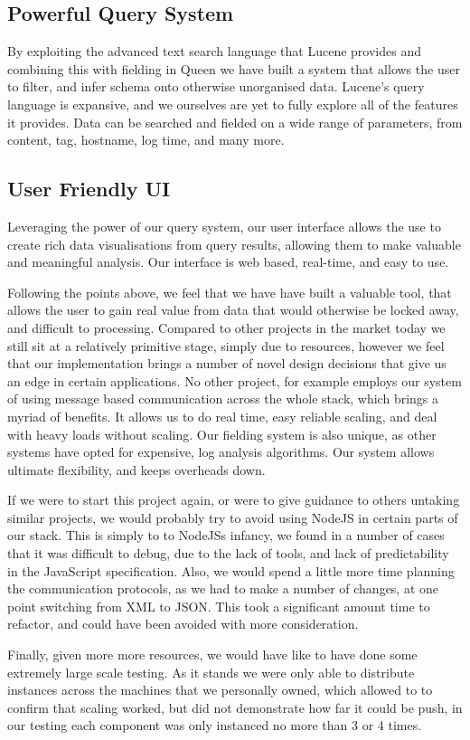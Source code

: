 \subsection{Powerful Query System}
By exploiting the advanced text search language that Lucene provides and
combining this with fielding in Queen we have built a system that allows the
user to filter, and infer schema onto otherwise unorganised data. Lucene's query
language is expansive, and we ourselves are yet to fully explore all of the
features it provides. Data can be searched and fielded on a wide range of
parameters, from content, tag, hostname, log time, and many more.
\subsection{User Friendly UI}
Leveraging the power of our query system, our user interface allows the use to
create rich data visualisations from query results, allowing them to make
valuable and meaningful analysis. Our interface is web based, real-time, and
easy to use.

\vspace{5mm}

Following the points above, we feel that we have have built a valuable tool,
that allows the user to gain real value from data that would otherwise be locked
away, and difficult to processing. Compared to other projects in the market
today we still sit at a relatively primitive stage, simply due to resources,
however we feel that our implementation brings a number of novel design
decisions that give us an edge in certain applications. No other project, for
example employs our system of using message based communication across the whole
stack, which brings a myriad of benefits. It allows us to do real time,  easy
reliable scaling, and deal with heavy loads without scaling. Our fielding system
is also unique, as other systems have opted for expensive, log analysis
algorithms. Our system allows ultimate flexibility, and keeps overheads down.

If we were to start this project again, or were to give guidance to others
untaking similar projects, we would probably try to avoid using NodeJS in
certain parts of our stack. This is simply to to NodeJSs infancy, we found in
a number of cases that it was difficult to debug, due to the lack of tools,
and lack of predictability in the JavaScript specification. Also, we would
spend a little more time planning the communication protocols, as we had to
make a number of changes, at one point switching from XML to JSON. This took a
significant amount time to refactor, and could have been avoided with more
consideration.

Finally, given more more resources, we would have like to have done some
extremely large scale testing. As it stands we were only able to distribute
instances across the machines that we personally owned, which allowed to to
confirm that scaling worked, but did not demonstrate how far it could be
push, in our testing each component was only instanced no more than 3 or 4
times.


